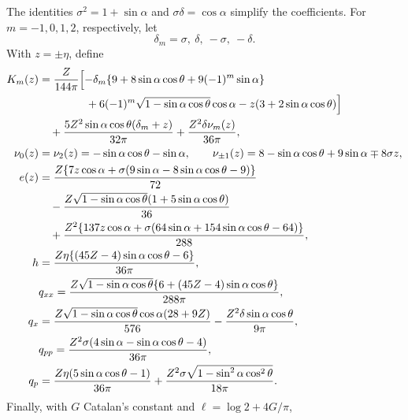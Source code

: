 \documentclass[10pt]{article}
\begin{document}
The identities $\sigma^2=1+\sin\alpha$ and $\sigma\delta=\cos\alpha$ simplify the coefficients.
For $m=-1,0,1,2$, respectively, let
\begin{equation}
 \delta_m=\sigma,\ \delta,\ -\sigma,\ -\delta.
\end{equation}
With $z=\pm\eta$, define
\begin{align}
 K_m(z)&=\frac{Z}{144\pi}\Bigl[-\delta_m\{9+8\sin\alpha\cos\theta+9(-1)^m\sin\alpha\}
 \nonumber\\ &\hspace{15mm}+6(-1)^m\sqrt{1-\sin\alpha\cos\theta}\cos\alpha-z(3+2\sin\alpha\cos\theta)\Bigr]\nonumber\\
 &\quad+\frac{5Z^2\sin\alpha\cos\theta(\delta_m+z)}{32\pi}
 +\frac{Z^2\delta\nu_m(z)}{36\pi},\label{eq:K}\\
 \nu_0(z)&=\nu_2(z)=-\sin\alpha\cos\theta-\sin\alpha,\qquad
 \nu_{\pm1}(z)=8-\sin\alpha\cos\theta+9\sin\alpha\mp8\sigma z,\nonumber\\
 e(z)&=\frac{Z\{7z\cos\alpha+\sigma(9\sin\alpha-8\sin\alpha\cos\theta-9)\}}{72}\nonumber\\ &\quad-\frac{Z\sqrt{1-\sin\alpha\cos\theta}(1+5\sin\alpha\cos\theta)}{36}\nonumber\\
 &\quad+\frac{Z^2\{137z\cos\alpha+\sigma(64\sin\alpha+154\sin\alpha\cos\theta-64)\}}{288},\nonumber\\
 h&=\frac{Z\eta\{(45Z-4)\sin\alpha\cos\theta-6\}}{36\pi},\nonumber\\ &
 q_{xx}=\frac{Z\sqrt{1-\sin\alpha\cos\theta}\{6+(45Z-4)\sin\alpha\cos\theta\}}{288\pi},\nonumber\\
 q_x&=\frac{Z\sqrt{1-\sin\alpha\cos\theta}\cos\alpha(28+9Z)}{576}-\frac{Z^2\delta\sin\alpha\cos\theta}{9\pi},\nonumber\\ &
 q_{pp}=\frac{Z^2\sigma(4\sin\alpha-\sin\alpha\cos\theta-4)}{36\pi},\nonumber\\
 q_p&=\frac{Z\eta(5\sin\alpha\cos\theta-1)}{36\pi}+\frac{Z^2\sigma\sqrt{1-\sin^2\alpha\cos^2\theta}}{18\pi}.\nonumber
\end{align}
Finally, with $G$ Catalan's constant and $\ell=\log2+4G/\pi$,
\end{document}
